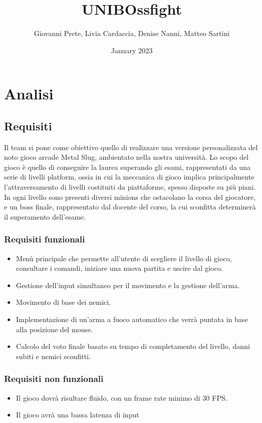\documentclass{article}
\title{UNIBOssfight}
\author{Giovanni Prete, Livia Cardaccia, Denise Nanni, Matteo Sartini}
\date{January 2023}
\begin{document}
\large
\tableofcontents
\maketitle

\section{Analisi}

\subsection{Requisiti} 
Il team si pone come obiettivo quello di realizzare una versione personalizzata del noto gioco arcade Metal Slug, ambientato nella nostra università. 
Lo scopo del gioco è quello di conseguire la laurea superando gli esami, rappresentati da una serie di livelli platform, ossia in cui la meccanica di gioco implica principalmente l'attraversamento di livelli costituiti da piattaforme, spesso disposte su più piani.
In ogni livello sono presenti diversi minions che ostacolano la corsa del giocatore, e un boss finale, rappresentato dal docente del corso, la cui sconfitta determinerà il superamento dell'esame. 
\subsubsection{Requisiti funzionali}
\begin{itemize}
    \item Menù principale che permette all'utente di scegliere il livello di gioco, consultare i comandi, iniziare una nuova partita e uscire dal gioco.
    \item Gestione dell'input simultaneo per il movimento e la gestione dell'arma.
    \item Movimento di base dei nemici.
    \item Implementazione di un'arma a fuoco automatico che verrà puntata in base alla posizione del mouse.
    \item Calcolo del voto finale basato su tempo di completamento del livello, danni subiti e nemici sconfitti.
\end{itemize}
\subsubsection{Requisiti non funzionali}
\begin{itemize}
    \item Il gioco dovrà risultare fluido, con un frame rate minimo di 30 FPS.
    \item Il gioco avrà una bassa latenza di input
\end{itemize}
\end{document}
